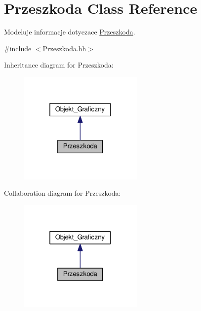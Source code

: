 \hypertarget{class_przeszkoda}{\section{Przeszkoda Class Reference}
\label{class_przeszkoda}
}


Modeluje informacje dotyczace \hyperlink{class_przeszkoda}{Przeszkoda}.  




{\ttfamily \#include $<$Przeszkoda.\+hh$>$}



Inheritance diagram for Przeszkoda\+:\nopagebreak
\begin{figure}[H]
\begin{center}
\leavevmode
\includegraphics[width=172pt]{class_przeszkoda__inherit__graph}
\end{center}
\end{figure}


Collaboration diagram for Przeszkoda\+:\nopagebreak
\begin{figure}[H]
\begin{center}
\leavevmode
\includegraphics[width=172pt]{class_przeszkoda__coll__graph}
\end{center}
\end{figure}
